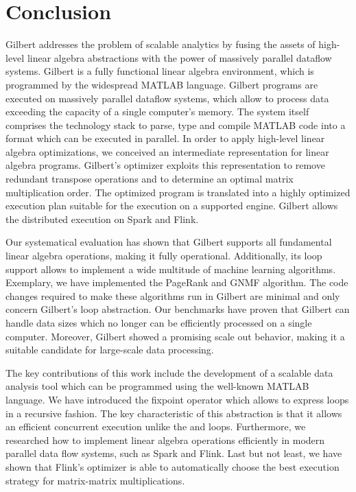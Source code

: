 \section{Conclusion}
\label{sec:conclusion}

Gilbert addresses the problem of scalable analytics by fusing the assets of high-level linear algebra abstractions with the power of massively parallel dataflow systems. 
Gilbert is a fully functional linear algebra environment, which is programmed by the widespread MATLAB language. 
Gilbert programs are executed on massively parallel dataflow systems, which allow to process data exceeding the capacity of a single computer's memory. 
The system itself comprises the technology stack to parse, type and compile MATLAB code into a format which can be executed in parallel. 
In order to apply high-level linear algebra optimizations, we conceived an intermediate representation for linear algebra programs. 
Gilbert's optimizer exploits this representation to remove redundant transpose operations and to determine an optimal matrix multiplication order. 
The optimized program is translated into a highly optimized execution plan suitable for the execution on a supported engine. 
Gilbert allows the distributed execution on Spark and Flink. 

Our systematical evaluation has shown that Gilbert supports all fundamental linear algebra operations, making it fully operational.
Additionally, its loop support allows to implement a wide multitude of machine learning algorithms.
Exemplary, we have implemented the PageRank and GNMF algorithm.
The code changes required to make these algorithms run in Gilbert are minimal and only concern Gilbert's loop abstraction.
Our benchmarks have proven that Gilbert can handle data sizes which no longer can be efficiently processed on a single computer.
Moreover, Gilbert showed a promising scale out behavior, making it a suitable candidate for large-scale data processing.

The key contributions of this work include the development of a scalable data analysis tool which can be programmed using the well-known MATLAB language. 
We have introduced the fixpoint operator which allows to express loops in a recursive fashion. 
The key characteristic of this abstraction is that it allows an efficient concurrent execution unlike the  and  loops. 
Furthermore, we researched how to implement linear algebra operations efficiently in modern parallel data flow systems, such as Spark and Flink. 
Last but not least, we have shown that Flink's optimizer is able to automatically choose the best execution strategy for matrix-matrix multiplications. 

